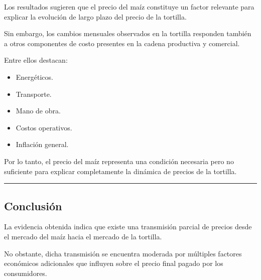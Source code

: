 \documentclass[11pt]{article}
\providecommand{\tightlist}{%
      \setlength{\itemsep}{0pt}\setlength{\parskip}{0pt}}
\begin{document}
Los resultados sugieren que el precio del maíz constituye un factor
relevante para explicar la evolución de largo plazo del precio de la
tortilla.

Sin embargo, los cambios mensuales observados en la tortilla responden
también a otros componentes de costo presentes en la cadena productiva y
comercial.

Entre ellos destacan:

\begin{itemize}
\tightlist
\item
  Energéticos.
\item
  Transporte.
\item
  Mano de obra.
\item
  Costos operativos.
\item
  Inflación general.
\end{itemize}

Por lo tanto, el precio del maíz representa una condición necesaria pero
no suficiente para explicar completamente la dinámica de precios de la
tortilla.

\begin{center}\rule{0.5\linewidth}{0.5pt}\end{center}

\hypertarget{conclusiuxf3n}{%
\subsection{Conclusión}\label{conclusiuxf3n}}

La evidencia obtenida indica que existe una transmisión parcial de
precios desde el mercado del maíz hacia el mercado de la tortilla.

No obstante, dicha transmisión se encuentra moderada por múltiples
factores económicos adicionales que influyen sobre el precio final
pagado por los consumidores.
\end{document}
